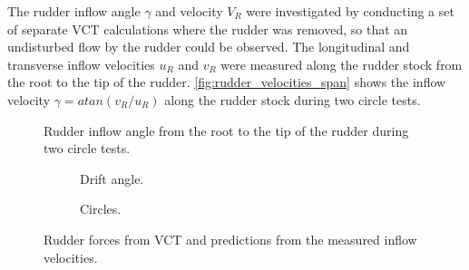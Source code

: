 The rudder inflow angle $\gamma$ and velocity $V_R$ were investigated by conducting a set of separate VCT calculations where the rudder was removed, so that an undisturbed flow by the rudder could be observed. The longitudinal and transverse inflow velocities $u_R$ and $v_R$ were measured along the rudder stock from the root to the tip of the rudder. \autoref{fig:rudder_velocities_span} shows the inflow velocity $\gamma=atan(v_R/u_R)$ along the rudder stock during two circle tests.
\begin{figure}[h]
    \centering 
    
    \caption{Rudder inflow angle from the root to the tip of the rudder during two circle tests.}
     \label{fig:rudder_velocities_span}
\end{figure}
\begin{figure}[h]
     \centering
     \begin{subfigure}[b]{\textwidth}
         \centering
         
        \caption{Drift angle.}
        \label{fig:inflow_to_force_drift_angle}
     \end{subfigure}
     \vfill
     \begin{subfigure}[b]{\textwidth}
         
        \caption{Circles.}
        \label{fig:inflow_to_force_circle}
     \end{subfigure}
        \caption{Rudder forces from VCT and predictions from the measured inflow velocities.}
        \label{fig:inflow_to_rudder_force}
\end{figure}
